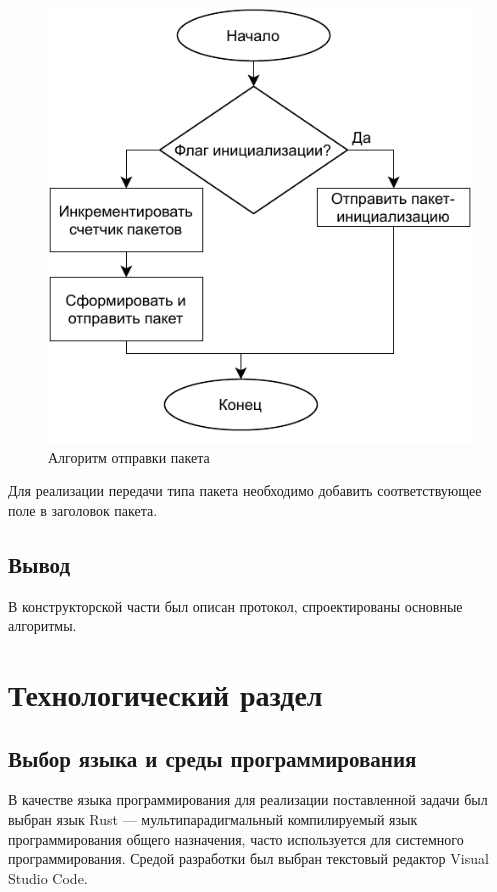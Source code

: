 \documentclass[14pt, a4paper]{extarticle}
\begin{document}
\begin{figure}[H]
	\centering
	\includegraphics[scale=1]{send.pdf}
	\caption{Алгоритм отправки пакета}
	\label{send}
\end{figure}

\indent Для реализации передачи типа пакета необходимо добавить соответствующее поле в заголовок пакета.
\subsection{Вывод}
В конструкторской части был описан протокол, спроектированы основные алгоритмы. 

\clearpage
\section{Технологический раздел}
\subsection{Выбор языка и среды программирования}
В качестве языка программирования для реализации поставленной
задачи был выбран язык Rust\cite{rust} --- мультипарадигмальный компилируемый язык программирования общего назначения, часто используется для системного программирования. Средой разработки был выбран текстовый редактор Visual Studio Code\cite{vscode}.
\end{document}
